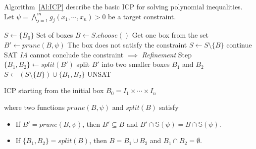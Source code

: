 \documentclass[runningheads,a4paper,oribibl]{llncs}
\begin{document}




Algorithm~\ref{Al:ICP} describe the basic ICP for solving polynomial inequalities.
Let $\psi = \bigwedge\limits_{j=1}^mg_j(x_1, \cdots, x_n) > 0$ be a target constraint. 
\begin{algorithm}
\begin{algorithmic}[1]
\State $S \gets \{B_0\}$ \Comment Set of boxes
  \State $B \gets S.choose()$ \Comment Get one box from the set
  \State $B' \gets prune(B, \psi)$
   \Comment The box does not satisfy the constraint
  	\State $S \gets S \setminus \{B\}$
  	\State continue
  	\State \Return SAT
  \Else \Comment \emph{IA} cannot conclude the constraint $\implies$ \emph{Refinement} Step
  	\State $\{B_1, B_2\} \gets split(B')$ \Comment split $B'$ into two smaller boxes $B_1$ and $B_2$	
  	\State $S \gets (S \setminus \{B\}) \cup \{B_1, B_2\}$
  \EndIf
\EndWhile
\State \Return UNSAT
\end{algorithmic}
\caption{ICP starting from the initial box $B_0 = I_1 \times \cdots \times I_n$}
\label{Al:ICP}
\end{algorithm}

\noindent
where two functions $prune(B,\psi)$ and $split(B)$ satisfy 
\begin{itemize}
\item If $B' = prune (B, \psi)$,
  then $B' \subseteq B $ and $ B' \cap \mathbb{S}(\psi) = B \cap \mathbb{S}(\psi)$. 
\item If $\{B_1, B_2\} = split (B)$,
  then $B = B_1 \cup B_2$ and $B_1 \cap B_2 = \emptyset$. 
\end{itemize}
\end{document}
